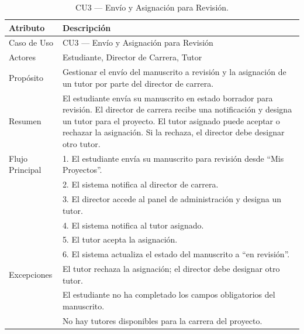 \begin{table}[H]
\centering
\caption{CU3 — Envío y Asignación para Revisión.}
\label{tab:cu3}
\begin{tabular}{lp{10cm}}
\toprule
\textbf{Atributo} & \textbf{Descripción} \\
\midrule
Caso de Uso & CU3 — Envío y Asignación para Revisión \\
Actores & Estudiante, Director de Carrera, Tutor \\
Propósito & Gestionar el envío del manuscrito a revisión y la asignación de un tutor por parte del director de carrera. \\
Resumen & El estudiante envía su manuscrito en estado borrador para revisión. El director de carrera recibe una notificación y designa un tutor para el proyecto. El tutor asignado puede aceptar o rechazar la asignación. Si la rechaza, el director debe designar otro tutor. \\
Flujo Principal & 1. El estudiante envía su manuscrito para revisión desde ``Mis Proyectos''. \\
& 2. El sistema notifica al director de carrera. \\
& 3. El director accede al panel de administración y designa un tutor. \\
& 4. El sistema notifica al tutor asignado. \\
& 5. El tutor acepta la asignación. \\
& 6. El sistema actualiza el estado del manuscrito a ``en revisión''. \\
Excepciones & El tutor rechaza la asignación; el director debe designar otro tutor. \\
& El estudiante no ha completado los campos obligatorios del manuscrito. \\
& No hay tutores disponibles para la carrera del proyecto. \\
\bottomrule
\end{tabular}
\end{table}

